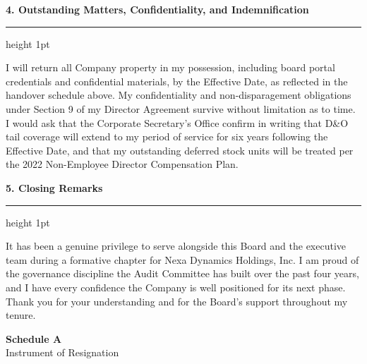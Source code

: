 \documentclass[english,11pt]{g-brief}
\newcommand{\lettersection}[1]{%
  \vspace{2.5mm}%
  {\color{BoardNavy}\Large\bfseries #1}\par%
  \vspace{0.5mm}%
  {\color{BrassGold}\hrule height 1pt}\par%
  \vspace{1.5mm}%
}
\begin{document}
\begin{g-brief}
\lettersection{4. Outstanding Matters, Confidentiality, and Indemnification}

I will return all Company property in my possession, including board portal credentials and confidential materials, by the Effective Date, as reflected in the handover schedule above. My confidentiality and non-disparagement obligations under Section 9 of my Director Agreement survive without limitation as to time. I would ask that the Corporate Secretary's Office confirm in writing that D\&O tail coverage will extend to my period of service for six years following the Effective Date, and that my outstanding deferred stock units will be treated per the 2022 Non-Employee Director Compensation Plan.

\lettersection{5. Closing Remarks}

It has been a genuine privilege to serve alongside this Board and the executive team during a formative chapter for Nexa Dynamics Holdings, Inc. I am proud of the governance discipline the Audit Committee has built over the past four years, and I have every confidence the Company is well positioned for its next phase. Thank you for your understanding and for the Board's support throughout my tenure.

\end{g-brief}

\addtolength{\textheight}{63mm}

\newpage
\thispagestyle{regularpage}

\begin{center}
{\color{BoardNavy}\Huge\bfseries Schedule A}\\[2mm]
{\color{SlateGray}\Large Instrument of Resignation}
\end{center}

\vspace{3mm}

\begin{center}
\end{center}
\end{document}
